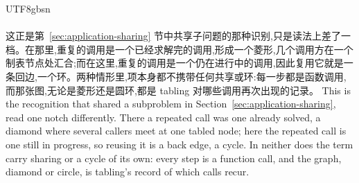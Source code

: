\begin{CJK*}{UTF8}{gbsn}
  \paragraph{}
  \ifTablambdaChinese
  这正是第~\ref{sec:application-sharing} 节中共享子问题的那种识别,只是读法上差了一档。在那里,重复的调用是一个已经求解完的调用,形成一个菱形,几个调用方在一个制表节点处汇合;而在这里,重复的调用是一个仍在进行中的调用,因此复用它就是一条回边,一个环。两种情形里,项本身都不携带任何共享或环:每一步都是函数调用,而那张图,无论是菱形还是圆环,都是 tabling 对哪些调用再次出现的记录。
  \else
  This is the recognition that shared a subproblem in Section~\ref{sec:application-sharing}, read one notch differently. There a repeated call was one already solved, a diamond where several callers meet at one tabled node; here the repeated call is one still in progress, so reusing it is a back edge, a cycle. In neither does the term carry sharing or a cycle of its own: every step is a function call, and the graph, diamond or circle, is tabling's record of which calls recur.
  \fi

  \begin{figure}
    \centering
    
    \caption{}
    \label{fig:cyclic-zeros}
  \end{figure}


\end{CJK*}
